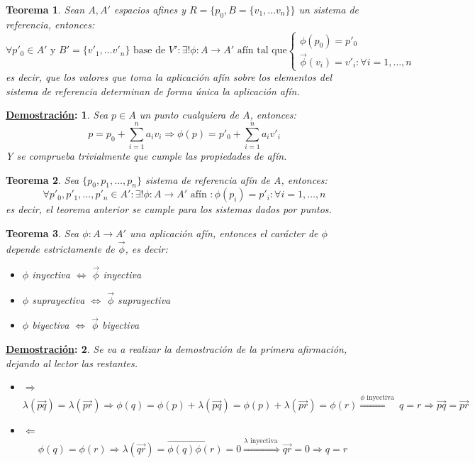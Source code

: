 \documentclass[10pt,a4paper,openright]{book}
\theoremstyle{break}
\newtheorem*{theo}{Teorema}
\newtheorem*{demo}{\underline{Demostración}:}
\begin{document}
\begin{theo}
Sean $A, A'$ espacios afines y $R=\{p_0, B=\{v_1, \ldots v_n\}\}$ un sistema de referencia, entonces:
$$\forall p'_0 \in A' \mbox{ y }B'= \{v'_1, \ldots v'_n\} \mbox{ base de }V':\exists ! \phi: A \to A'\mbox{ afín tal que} \begin{cases} \phi(p_0) = p'_0 \\ \vec{\phi} (v_i) = v'_i : \forall i = 1, \ldots, n \end{cases}$$
es decir, que los valores que toma la aplicación afín sobre los elementos del sistema de referencia determinan de forma única la aplicación afín.
\end{theo}
\begin{demo}
Sea $p \in A $ un punto cualquiera de $A$, entonces:
$$p = p_0 + \sum_{i=1}^{n} a_i v_i \Rightarrow  \phi(p) = p'_0 + \sum_{i=1}^{n} a_i v'_i $$
Y se comprueba trivialmente que cumple las propiedades de afín.
\end{demo}

\begin{theo}
Sea $\{p_0, p_1, \ldots, p_n\}$ sistema de referencia afín de A, entonces:
$$\forall p'_0, p'_1, \ldots, p'_n \in A': \exists! \phi: A \to A' \mbox{ afín }:\phi (p_i) = p'_i : \forall i = 1, \ldots, n$$
es decir, el teorema anterior se cumple para los sistemas dados por puntos.
\end{theo}

\begin{theo}
Sea $\phi: A\rightarrow A'$ una aplicación afín, entonces el carácter de $\phi$ depende estrictamente de $\vec{\phi}$, es decir:
\begin{itemize}
\item $\phi$ inyectiva $\Leftrightarrow$ $\vec{\phi}$ inyectiva
\item $\phi$ suprayectiva $\Leftrightarrow$ $\vec{\phi}$ suprayectiva
\item $\phi$ biyectiva $\Leftrightarrow$ $\vec{\phi}$ biyectiva
\end{itemize}
\end{theo}
\begin{demo}
Se va a realizar la demostración de la primera afirmación, dejando al lector las restantes.
\begin{itemize}
\item $\Rightarrow$
$$\lambda (\vec{pq}) = \lambda (\vec{pr}) \Rightarrow  \phi(q) = \phi(p) + \lambda(\vec{pq}) = \phi(p) + \lambda(\vec{pr}) = \phi(r) \overset{\phi \mbox{ inyectiva }}{\Rightarrow} q = r \Rightarrow \vec{pq} = \vec{pr}$$
\item $\Leftarrow$
$$\phi(q) = \phi(r) \Rightarrow \lambda (\vec{qr}) = \overrightarrow{\phi(q) \phi(r)} = 0 \overset{\lambda \mbox{ inyectiva }}{\Rightarrow} \vec{qr} = 0 \Rightarrow q = r$$
\end{itemize}
\end{demo}
\end{document}
